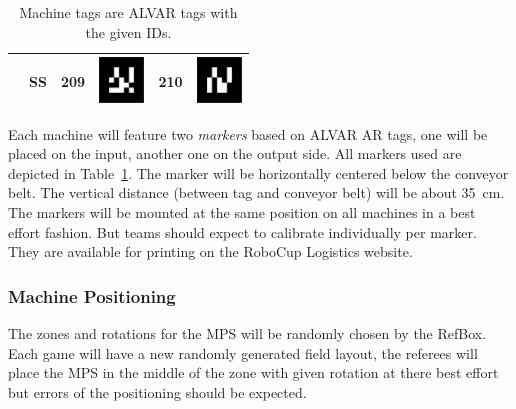 \documentclass[12pt,twoside]{article}
\newcommand{\reftab}[1]{Table~\ref{#1}}
\begin{document}
\begin{table}[b!]
\begin{tabular}{|l|c|c|c|c|c|}
    &SS&209&\parbox[c]{1.2cm}{\includegraphics[width=1.2cm]{markers/figure_209}}&210&\parbox[c]{1.2cm}{\includegraphics[width=1.2cm]{markers/figure_210}}\\[2.5ex]\hline
  \end{tabular}
  \caption{Machine tags are ALVAR tags with the given IDs.}
  \label{tab:markers}
\end{table}
Each machine will feature two \emph{markers} based on ALVAR AR tags,
one will be placed on the input, another one on the output side. All
markers used are depicted in \reftab{tab:markers}. The marker will be
horizontally centered below the conveyor belt. The vertical distance
(between tag and conveyor belt) will be about
\SI{35}{\centi\metre}. The markers will be mounted at the same
position on all machines in a best effort fashion. But teams should
expect to calibrate individually per marker. They are available for
printing on the RoboCup Logistics website.


\subsubsection{Machine Positioning}
\label{sec:machine-swapping}
The zones and rotations for the MPS will be randomly chosen by the RefBox.
Each game will have a new randomly generated field layout, the referees will place the MPS in the middle of the zone with given rotation at there best effort but errors of the positioning should be expected.
\end{document}
